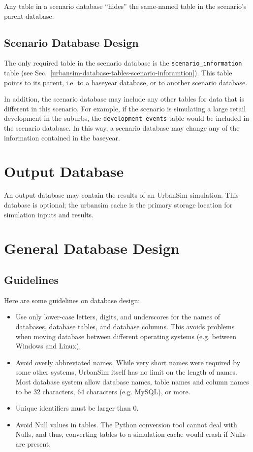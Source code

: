 Any table in a scenario database ``hides'' the same-named table in the
scenario's parent database.

\subsection{Scenario Database Design}

The only required table in the scenario database is the
\verb|scenario_information| table (see Sec.~\ref{urbansim-database-tables-scenario-inforamtion}).
This table points to its parent, i.e. to a baseyear database, or
to another scenario database.

In addition, the scenario database may include any other tables for data that
is different in this scenario. For example, if the scenario is simulating a
large retail development in the suburbs, the \verb|development_events| table
would be included in the scenario database.  In this way, a scenario database
may change any of the information contained in the baseyear.

\section{Output Database}

An output database may contain the results of an UrbanSim simulation.  This
database is optional; the urbansim cache is the primary storage location for
simulation inputs and results.

\section{General Database Design}

\subsection{Guidelines}

Here are some guidelines on database design:

\begin{itemize}
\item Use only lower-case letters, digits, and underscores for the names of
databases, database tables, and database columns. This avoids problems when
moving database between different operating systems (e.g. between Windows \windowsindex and
Linux). \linuxindex
\item Avoid overly abbreviated names.  While very short names were required by
some other systems, UrbanSim itself has no limit on the length of names. Most
database system allow database names, table names and column names to be 32
characters, 64 characters (e.g. MySQL), \mysqlindex or more.
\item Unique identifiers must be larger than 0. 
\item Avoid Null values in tables. The Python conversion tool cannot deal with 
Nulls, and thus, converting tables to a simulation cache would crash if Nulls are present.  
\end{itemize}

